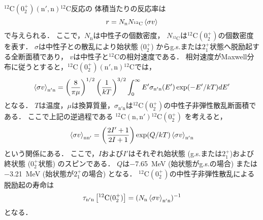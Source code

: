 \documentclass[../master]{subfiles}
\begin{document}
${}^{12}\mathrm{C}(0_2^+)(\mathrm{n}',\mathrm{n}){}^{12}\mathrm{C}$反応の
体積当たりの反応率は
\begin{equation}
  r = N_{\text{n}}N_{{}^{12}\mathrm{C}}\braket{\sigma v}%
  \label{eq::r}
\end{equation}
で与えられる．
ここで，$N_{\text{n}}$は中性子の個数密度，
$N_{{}^{12}\mathrm{C}}$は${}^{12}\mathrm{C}(0_2^+)$の個数密度を表す．
$\sigma$は中性子との散乱により始状態 ($0_2^+$) からg.s.または$2_{1}^{+}$状態へ脱励起する全断面積であり，
$v$は中性子と${}^{12}\mathrm{C}$の相対速度である．
相対速度がMaxwell分布に従うとすると，${}^{12}\mathrm{C}(0_2^+)(\mathrm{n'},\mathrm{n}){}^{12}\mathrm{C}$では，
\begin{equation}
  \braket{\sigma v}_{\mathrm{n'n}} =
  \left(\frac{8}{\pi\mu}\right)^{1/2}\left(\frac{1}{kT}\right)^{3/2}
  \int^{\infty}_{0}E'\sigma_{\mathrm{n'n}}(E')\exp(-E'/kT)dE'
  \label{eq::sigmann'}
\end{equation}
となる．
$T$は温度，$\mu$は換算質量，$\sigma_{\mathrm{n}'\mathrm{n}}$は${}^{12}\mathrm{C}(0_2^+)$の中性子非弾性散乱断面積である．
ここで上記の逆過程である ${}^{12}\mathrm{C}(\mathrm{n},\mathrm{n}'){}^{12}\mathrm{C}(0_2^+)$ を考えると，
\begin{equation}
  \braket{\sigma v}_{\mathrm{nn'}} = \left(\frac{2I'+1}{2I+1}\right)
  \exp(Q/kT)\braket{\sigma v}_{\mathrm{n'n}}
  \label{eq::sigman'n}
\end{equation}
という関係にある．
ここで，$I$および$I'$はそれぞれ始状態 (g.s.または$2_{1}^{+}$)および終状態 ($0_2^+$状態) のスピンである．
$Q$は\SI{-7.65}{\mega\electronvolt} (始状態がg.s.の場合) または
\SI{-3.21}{\mega\electronvolt} (始状態が$2_{1}^{+}$の場合) となる．
${}^{12}\mathrm{C} (0_2^+)$の中性子非弾性散乱による脱励起の寿命は
\begin{equation}
  \tau_{\mathrm{n'n}}\left[{}^{12}\mathrm{C} (0_2^+)\right] =
  (N_{\mathrm{n}}\braket{\sigma v}_{\mathrm{n'n}})^{-1} %
  \label{eq::tau}
\end{equation}
となる．
\end{document}
